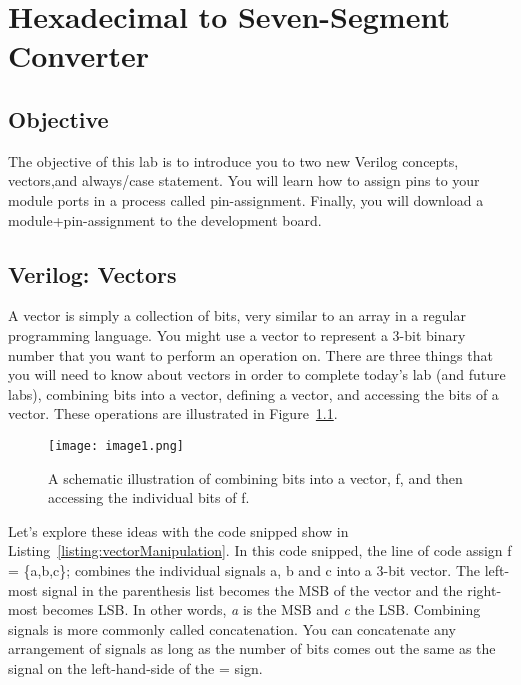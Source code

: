 \chapter{Hexadecimal to Seven-Segment Converter}
\label{chapter:HexToSeven}
\graphicspath{ {./Lab02HexToSeven/Fig} }


\hypertarget{objective}{%
\section{Objective }
\label{hex2Seven:objective}}

The objective of this lab is to introduce you to two new Verilog concepts, vectors,and always/case statement.
You will learn how to assign pins to your module ports in a process called pin-assignment.  Finally, you
will download a module+pin-assignment to the development board.


\section{Verilog: Vectors}

A vector is simply a collection of bits, very similar to an array in a
regular programming language. You might use a vector to represent a
3-bit binary number that you want to perform an operation on. There are
three things that you will need to know about vectors in order to
complete today's lab (and future labs), combining bits into a vector,
defining a vector, and accessing the bits of a vector. These operations
are illustrated in Figure~\ref{fig:combinVector}.

\begin{figure}[ht]
\texttt{[image: image1.png]}
\caption{A schematic illustration of combining bits into a vector, f, 
and then accessing the individual bits of f.}
\label{fig:combinVector}
\end{figure}

Let's explore these ideas with the code snipped show in Listing~\ref{listing:vectorManipulation}. 
In this code snipped, the line of code assign f = \{a,b,c\}; combines the
individual signals a, b and c into a 3-bit vector. The left-most signal
in the parenthesis list becomes the MSB of the vector and the right-most
becomes LSB. In other words, \emph{a} is the MSB and \emph{c} the LSB.
Combining signals is more commonly called concatenation. You can
concatenate any arrangement of signals as long as the number of bits
comes out the same as the signal on the left-hand-side of the = sign.


